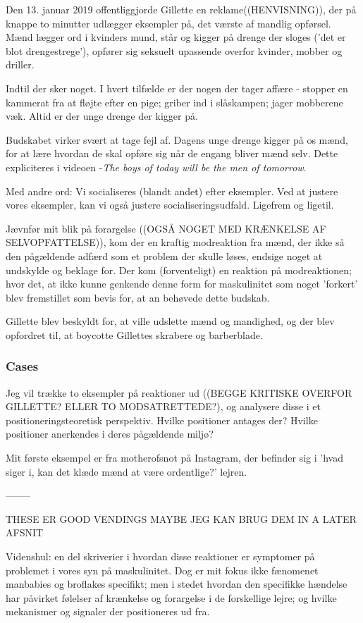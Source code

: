 Den 13. januar 2019 offentliggjorde Gillette en reklame((HENVISNING)), der på
knappe to minutter udlægger eksempler på, det værste af mandlig opførsel. Mænd
lægger ord i kvinders mund, står og kigger på drenge der sloges ('det er blot
drengestrege'), opfører sig seksuelt upassende overfor kvinder, mobber og
driller.

Indtil der sker noget. I hvert tilfælde er der nogen der tager affære - stopper
en kammerat fra at fløjte efter en pige; griber ind i slåskampen; jager
mobberene væk.  Altid er der unge drenge der kigger på.

Budskabet virker svært at tage fejl af. Dagens unge drenge kigger på os mænd,
for at lære hvordan de skal opføre sig når de engang bliver mænd selv.  Dette
expliciteres i videoen -\textit{The boys of today will be the men of tomorrow}.

Med andre ord: Vi socialiseres (blandt andet) efter eksempler. Ved at justere
vores eksempler, kan vi også justere socialiseringsudfald. Ligefrem og ligetil.

Jævnfør mit blik på forargelse ((OGSÅ NOGET MED KRÆNKELSE AF SELVOPFATTELSE)),
kom der en kraftig modreaktion fra mænd, der ikke så den pågældende adfærd som
et problem der skulle løses, endsige noget at undskylde og beklage for. Der kom
(forventeligt) en reaktion på modreaktionen; hvor det, at ikke kunne genkende
denne form for maskulinitet som noget 'forkert' blev fremstillet som bevis for,
at an behøvede dette budskab.

Gillette blev beskyldt for, at ville udslette mænd og mandighed, og der blev
opfordret til, at boycotte Gillettes skrabere og barberblade.

\subsubsection{Cases}

Jeg vil trække to eksempler på reaktioner ud ((BEGGE KRITISKE OVERFOR GILLETTE?
ELLER TO MODSATRETTEDE?), og analysere disse i et positioneringsteoretisk
perspektiv.  Hvilke positioner antages der? Hvilke positioner anerkendes i
deres pågældende miljø?

Mit første eksempel er fra motherofsnot på Instagram, der befinder sig i 'hvad
siger i, kan det klæde mænd at være ordentlige?' lejren.

—-----

THESE ER GOOD VENDINGS MAYBE JEG KAN BRUG DEM IN A LATER AFSNIT

Videnshul: en del skriverier i hvordan disse reaktioner er symptomer på
problemet i vores syn på maskulinitet. Dog er mit fokus ikke fænomenet
manbabies og broflakes specifikt; men i stedet hvordan den specifikke hændelse
har påvirket følelser af krænkelse og forargelse i de forskellige lejre; og
hvilke mekanismer og signaler der positioneres ud fra.

